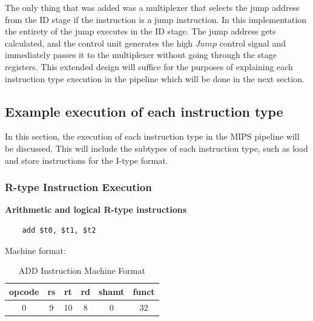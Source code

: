 The only thing that was added was a multiplexer that selects the jump address from the ID stage if the instruction is a jump instruction. In this implementation the entirety of the jump executes in the ID stage. The jump address gets calculated, and the control unit generates the high $Jump$ control signal and immediately passes it to the multiplexer without going through the stage registers. This extended design will suffice for the purposes of explaining each instruction type execution in the pipeline which will be done in the next section.


\subsection{Example execution of each instruction type}
In this section, the execution of each instruction type in the MIPS pipeline will be discussed. This will include the subtypes of each instruction type, such as load and store instructions for the I-type format.

\subsubsection{R-type Instruction Execution}

\textbf{Arithmetic and logical R-type instructions}\newline 

\begin{verbatim}
    add $t0, $t1, $t2
\end{verbatim}
Machine format:
\begin{table}[H]
    \centering
    \begin{tabular}{|c|c|c|c|c|c|}
    \hline
    \textbf{opcode} & \textbf{rs} & \textbf{rt} & \textbf{rd} & \textbf{shamt} & \textbf{funct} \\ \hline
    0             & 9          & 10         & 8          & 0            & 32            \\ \hline
    \end{tabular}
    \caption{ADD Instruction Machine Format}
    \label{tab:add_instruction}
\end{table}

